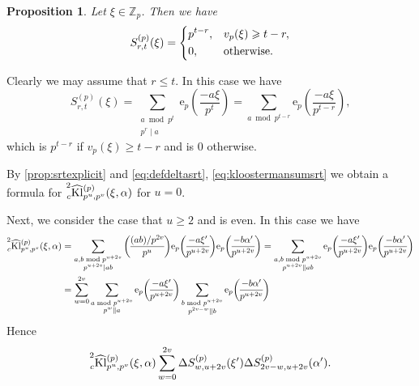\documentclass[10pt,oneside,reqno]{amsart}
\makeatletter
\newcommand\rme{\mathrm{e}}
\newcommand\ZZ{\mathbb{Z}}
\newcommand\Kl{\mathrm{Kl}}
\renewcommand\leq{\leqslant}
\renewcommand\geq{\geqslant}
\newcommand\legendresymbol[2]{\genfrac{(}{)}{}{}{#1}{#2}}
\theoremstyle{THEOREM}
\newtheorem{proposition}[theorem]{Proposition}
\theoremstyle{DEFINITION}
\theoremstyle{EXERCISE}
\numberwithin{equation}{section}
\renewenvironment{proof}[1][\proofname]{\par
  \vspace{-6pt}
  \pushQED{\qed}
  \normalfont \topsep6\p@\@plus6\p@\relax
  \trivlist
  \item[\hskip\labelsep\rmfamily\bfseries
    #1\@addpunct{:}]\ignorespaces
}{
  \popQED\endtrivlist\@endpefalse
  \vspace{-6pt}
}
\makeatother
\begin{document}
\begin{proposition}\label{prop:srtexplicit}
Let $\xi\in \ZZ_p$. Then we have
\begin{equation}\label{eq:srtexplicit}
S_{r,t}^{(p)}(\xi)=\begin{dcases}
                        p^{t-r}, & v_p(\xi)\geq t-r, \\
                        0, & \text{otherwise}.
                      \end{dcases}
\end{equation}
\end{proposition}
\begin{proof}
Clearly we may assume that $r\leq t$. In this case we have
\[
S_{r,t}^{(p)}(\xi)=\sum_{\substack{a\bmod p^t\\ p^r\mid a}}\rme_p\legendresymbol{-a\xi}{p^t}=\sum_{a\bmod p^{t-r}}\rme_p\legendresymbol{-a\xi}{p^{t-r}},
\]
which is $p^{t-r}$ if $v_p(\xi)\geq t-r$ and is $0$ otherwise.
\end{proof}
By \autoref{prop:srtexplicit} and \eqref{eq:defdeltasrt}, \eqref{eq:kloostermansumsrt} we obtain a formula for $\prescript{2}{c}{\widehat{\Kl}}_{p^u,p^v}^{(p)}(\xi,\alpha)$ for $u=0$.

Next, we consider the case that $u\geq 2$ and is even. In this case we have
\begin{align*}
\prescript{2}{c}{\widehat{\Kl}}_{p^u,p^v}^{(p)}(\xi,\alpha)&=\sum_{\substack{a,b\bmod p^{u+2v}\\ p^{u+2v}\mid ab}}\legendresymbol{(ab)/p^{2v}}{p^u}\rme_p\legendresymbol{-a\xi'}{p^{u+2v}} \rme_p\legendresymbol{-b\alpha'}{p^{u+2v}}=\sum_{\substack{a,b\bmod p^{u+2v}\\ p^{u+2v}\parallel ab}}\rme_p\legendresymbol{-a\xi'}{p^{u+2v}} \rme_p\legendresymbol{-b\alpha'}{p^{u+2v}}\\
&=\sum_{w=0}^{2v}\sum_{\substack{a\bmod p^{u+2v}\\ p^{w}\parallel a}}\rme_p\legendresymbol{-a\xi'}{p^{u+2v}} \sum_{\substack{b\bmod p^{u+2v}\\ p^{2v-w}\parallel b}} \rme_p\legendresymbol{-b\alpha'}{p^{u+2v}}
\end{align*}
Hence
\begin{equation}\label{eq:kloostermansumsrt2}
\prescript{2}{c}{\widehat{\Kl}}_{p^u,p^v}^{(p)}(\xi,\alpha) \sum_{w=0}^{2v}\Delta S_{w,u+2v}^{(p)}(\xi')\Delta S_{2v-w,u+2v}^{(p)}(\alpha').
\end{equation}
\end{document}

